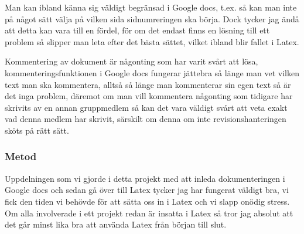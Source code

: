 
Man kan ibland känna sig väldigt begränsad i Google docs, t.ex. så kan man inte på något sätt välja på vilken sida sidnumreringen ska börja. Dock tycker jag ändå att detta kan vara till en fördel, för om det endast finns en lösning till ett problem så slipper man leta efter det bästa sättet, vilket ibland blir fallet i Latex.



Kommentering av dokument är någonting som har varit svårt att lösa, kommenteringsfunktionen i Google docs fungerar jättebra så länge man vet vilken text man ska kommentera, alltså så länge man kommenterar sin egen text så är det inga problem, däremot om man vill kommentera någonting som tidigare har skrivits av en annan gruppmedlem så kan det vara väldigt svårt att veta exakt vad denna medlem har skrivit, särskilt om denna om inte revisionshanteringen sköts på rätt sätt.



\subsubsection{Metod}
Uppdelningen som vi gjorde i detta projekt med att inleda dokumenteringen i Google docs och sedan gå över till Latex tycker jag har fungerat väldigt bra, vi fick den tiden vi behövde för att sätta oss in i Latex och vi slapp onödig stress. Om alla involverade i ett projekt redan är insatta i Latex så tror jag absolut att det går minst lika bra att använda Latex från början till slut.

